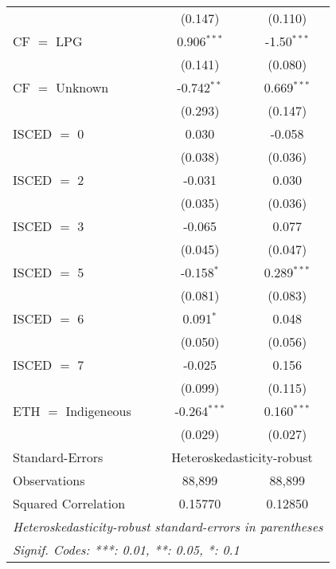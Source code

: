 \begin{table}[htbp!]
\begin{adjustbox}{width = 1\textwidth, max height = 0.95\textheight, center}
\begin{threeparttable}[b]
\begin{tabular}{lcc}
                                 & (0.147)        & (0.110)\\   
            CF $=$ LPG           & 0.906$^{***}$  & -1.50$^{***}$\\   
                                 & (0.141)        & (0.080)\\   
            CF $=$ Unknown       & -0.742$^{**}$  & 0.669$^{***}$\\   
                                 & (0.293)        & (0.147)\\   
            ISCED $=$ 0          & 0.030          & -0.058\\   
                                 & (0.038)        & (0.036)\\   
            ISCED $=$ 2          & -0.031         & 0.030\\   
                                 & (0.035)        & (0.036)\\   
            ISCED $=$ 3          & -0.065         & 0.077\\   
                                 & (0.045)        & (0.047)\\   
            ISCED $=$ 5          & -0.158$^{*}$   & 0.289$^{***}$\\   
                                 & (0.081)        & (0.083)\\   
            ISCED $=$ 6          & 0.091$^{*}$    & 0.048\\   
                                 & (0.050)        & (0.056)\\   
            ISCED $=$ 7          & -0.025         & 0.156\\   
                                 & (0.099)        & (0.115)\\   
            ETH $=$ Indigeneous  & -0.264$^{***}$ & 0.160$^{***}$\\   
                                 & (0.029)        & (0.027)\\   
            \midrule 
            Standard-Errors & \multicolumn{2}{c}{Heteroskedasticity-robust} \\ 
            Observations         & 88,899         & 88,899\\  
            Squared Correlation  & 0.15770        & 0.12850\\  
            \midrule \midrule
            \multicolumn{3}{l}{\emph{Heteroskedasticity-robust standard-errors in parentheses}}\\
            \multicolumn{3}{l}{\emph{Signif. Codes: ***: 0.01, **: 0.05, *: 0.1}}\\
         \end{tabular}
         

\end{threeparttable}
\end{adjustbox}
\end{table}
